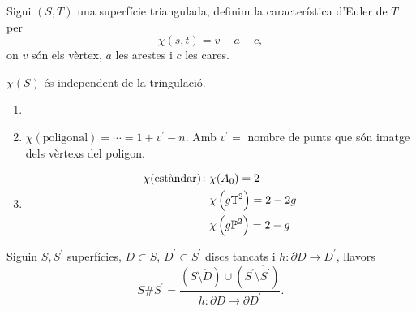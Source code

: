 \begin{defi}
    Sigui $(S, T)$ una superfície triangulada, definim la característica d'Euler de $T$ per
    \[
        \chi (s, t) = v - a + c,
    \]
    on $v$ són els vèrtex, $a$ les arestes i $c$ les cares.
\end{defi}

\begin{teo*}
    $\chi(S)$ és independent de la tringulació.
\end{teo*}

\begin{example}
    \begin{enumerate}
	\item[]
	\item $\chi(\text{poligonal}) = \cdots = 1 + v^\prime - n$. Amb $v^\prime = $ nombre de punts que són
		imatge dels vèrtexs del poligon.
	\item
	    \[
		\begin{aligned}
		    \chi (\text{estàndar}) \colon & \chi(A_0) = 2 \\ & \chi \left( g \mathbb{T}^2 \right) = 2 -2g \\
		    & \chi \left( g\mathbb{P}^2 \right) = 2 - g 
		\end{aligned}
	    \]
    \end{enumerate}
\end{example}

\begin{defi}
    Siguin $S, S^\prime$ superfícies, $D \subset S$, $D^\prime \subset S^\prime$ discs tancats i
    $h \colon \partial D \to D^\prime$, llavors
    \[
	S \# S^\prime = \frac{\left(S \setminus \mathring{D} \right) \cup 
	\left( S^\prime \setminus \mathring{S^\prime} \right)}{h \colon \partial D \to \partial D^\prime}.
    \]
\end{defi}
